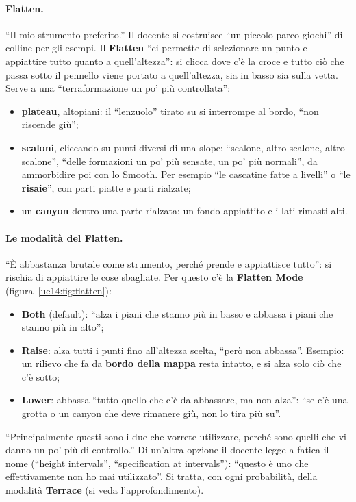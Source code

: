 \paragraph{Flatten.} ``Il mio strumento preferito.'' Il docente si costruisce ``un piccolo
parco giochi'' di colline per gli esempi. Il \textbf{Flatten} ``ci permette di selezionare un
punto e appiattire tutto quanto a quell'altezza'': si clicca dove c'è la croce e tutto ciò
che passa sotto il pennello viene portato a quell'altezza, sia in basso sia sulla vetta.
Serve a una ``terraformazione un po' più controllata'':
\begin{itemize}
  \item \textbf{plateau}, altopiani: il ``lenzuolo'' tirato su si interrompe al bordo,
        ``non riscende giù'';
  \item \textbf{scaloni}, cliccando su punti diversi di una slope: ``scalone, altro scalone,
        altro scalone'', ``delle formazioni un po' più sensate, un po' più normali'', da
        ammorbidire poi con lo Smooth. Per esempio ``le cascatine fatte a livelli'' o ``le
        \textbf{risaie}'', con parti piatte e parti rialzate;
  \item un \textbf{canyon} dentro una parte rialzata: un fondo appiattito e i lati rimasti
        alti.
\end{itemize}

\paragraph{Le modalità del Flatten.} ``È abbastanza brutale come strumento, perché prende e
appiattisce tutto'': si rischia di appiattire le cose sbagliate. Per questo c'è la
\textbf{Flatten Mode} (figura~\ref{ue14:fig:flatten}):
\begin{itemize}
  \item \textbf{Both} (default): ``alza i piani che stanno più in basso e abbassa i piani che
        stanno più in alto'';
  \item \textbf{Raise}: alza tutti i punti fino all'altezza scelta, ``però non abbassa''.
        Esempio: un rilievo che fa da \textbf{bordo della mappa} resta intatto, e si alza
        solo ciò che c'è sotto;
  \item \textbf{Lower}: abbassa ``tutto quello che c'è da abbassare, ma non alza'': ``se c'è
        una grotta o un canyon che deve rimanere giù, non lo tira più su''.
\end{itemize}
``Principalmente questi sono i due che vorrete utilizzare, perché sono quelli che vi danno
un po' più di controllo.'' Di un'altra opzione il docente legge a fatica il nome (``height
intervals'', ``specification at intervals''): ``questo è uno che effettivamente non ho mai
utilizzato''. Si tratta, con ogni probabilità, della modalità \textbf{Terrace} (si veda
l'approfondimento).

